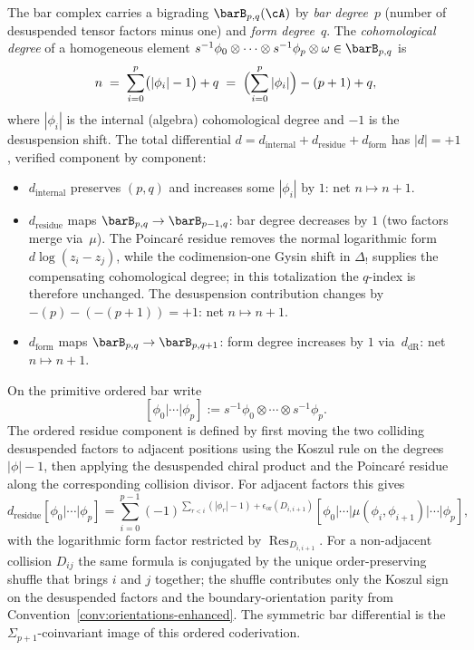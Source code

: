 \begin{definition}\label{def:bar-differential-complete}%
\label{def:geometric-bar}\label{def:geometric-bar-definition}\label{def:bar-geometric}%
\label{def:bar-diff-detailed}\label{def:diff-total}%
The bar complex carries a bigrading
$\barB_{p,q}(\cA)$ by \emph{bar degree}~$p$ (number of
desuspended tensor factors minus one) and
\emph{form degree}~$q$. The \emph{cohomological
degree} of a homogeneous element
$s^{-1}\phi_0 \otimes \cdots \otimes s^{-1}\phi_p
\otimes \omega \in \barB_{p,q}$ is
\begin{equation}\label{eq:bar-cohomological-degree}
n \;=\; \sum_{i=0}^{p}\bigl(|\phi_i| - 1\bigr) + q
\;=\; \Bigl(\sum_{i=0}^{p} |\phi_i|\Bigr) - (p+1) + q,
\end{equation}
where $|\phi_i|$ is the internal (algebra) cohomological
degree and $-1$ is the desuspension shift. The total
differential $d = d_{\mathrm{internal}} +
d_{\mathrm{residue}} + d_{\mathrm{form}}$ has
$|d| = +1$, verified component by component:
\begin{itemize}
\item $d_{\mathrm{internal}}$ preserves $(p,q)$ and
 increases some $|\phi_i|$ by $1$: net $n \mapsto n+1$.
\item $d_{\mathrm{residue}}$ maps
 $\barB_{p,q} \to \barB_{p-1,q}$: bar degree
 decreases by $1$ (two factors merge via~$\mu$). The
 Poincar\'e residue removes the normal logarithmic form
 $d\log(z_i-z_j)$, while the codimension-one Gysin shift in
 $\Delta_!$ supplies the compensating cohomological degree; in this
 totalization the $q$-index is therefore unchanged. The
 desuspension contribution changes by $-(p) - (-(p+1)) = +1$:
 net $n \mapsto n+1$.
\item $d_{\mathrm{form}}$ maps
 $\barB_{p,q} \to \barB_{p,q+1}$: form degree
 increases by $1$ via~$d_{\mathrm{dR}}$:
 net $n \mapsto n+1$.
\end{itemize}
\noindent
On the primitive ordered bar write
\[
[\phi_0|\cdots|\phi_p]
:=s^{-1}\phi_0\otimes\cdots\otimes s^{-1}\phi_p.
\]
The ordered residue component is defined by first moving the two
colliding desuspended factors to adjacent positions using the Koszul
rule on the degrees $|\phi|-1$, then applying the desuspended chiral
product and the Poincar\'e residue along the corresponding collision
divisor. For adjacent factors this gives
\[
d_{\mathrm{residue}}
[\phi_0|\cdots|\phi_p]
=
\sum_{i=0}^{p-1}
(-1)^{\sum_{r<i}(|\phi_r|-1)+\epsilon_{\mathrm{or}}(D_{i,i+1})}
[\phi_0|\cdots|\mu(\phi_i,\phi_{i+1})|\cdots|\phi_p],
\]
with the logarithmic form factor restricted by
$\operatorname{Res}_{D_{i,i+1}}$. For a non-adjacent collision
$D_{ij}$ the same formula is conjugated by the unique order-preserving
shuffle that brings $i$ and $j$ together; the shuffle contributes only
the Koszul sign on the desuspended factors and the boundary-orientation
parity from Convention~\ref{conv:orientations-enhanced}. The symmetric
bar differential is the $\Sigma_{p+1}$-coinvariant image of this
ordered coderivation.


\end{definition}
